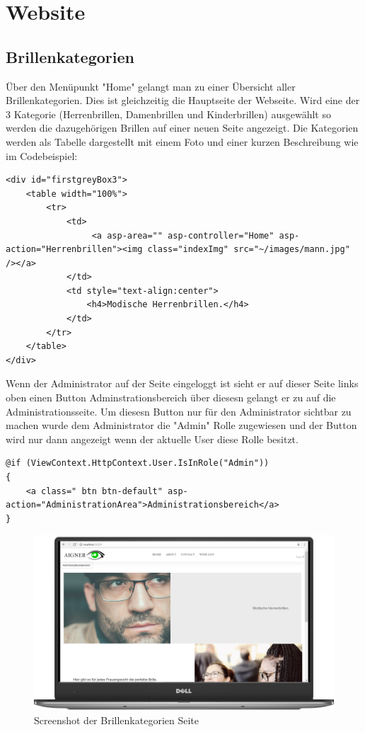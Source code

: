 \section{Website}
\subsection{Brillenkategorien}
Über den Menüpunkt "Home" gelangt man zu einer Übersicht aller Brillenkategorien. Dies ist gleichzeitig die Hauptseite der Webseite. Wird eine der 3 Kategorie (Herrenbrillen, Damenbrillen und Kinderbrillen) ausgewählt so werden die dazugehörigen Brillen auf einer neuen Seite angezeigt.
Die Kategorien werden als Tabelle dargestellt mit einem Foto und einer kurzen Beschreibung wie im Codebeispiel:
\begin{lstlisting}
<div id="firstgreyBox3">
    <table width="100%">
        <tr>
            <td>
                 <a asp-area="" asp-controller="Home" asp-action="Herrenbrillen"><img class="indexImg" src="~/images/mann.jpg" /></a> 
            </td>
            <td style="text-align:center">
                <h4>Modische Herrenbrillen.</h4>
            </td>
        </tr>
    </table>
</div>
\end{lstlisting}
Wenn der Administrator auf der Seite eingeloggt ist sieht er auf dieser Seite links oben einen Button Adminstrationsbereich über diesesn gelangt er zu auf die Administrationsseite. Um diesesn Button nur für den Administrator sichtbar zu machen wurde dem Administrator die "Admin" Rolle zugewiesen und der Button wird nur dann angezeigt wenn der aktuelle User diese Rolle besitzt.

\begin{lstlisting}
@if (ViewContext.HttpContext.User.IsInRole("Admin"))
{
    <a class=" btn btn-default" asp-action="AdministrationArea">Administrationsbereich</a>
}
\end{lstlisting}


\begin{figure}[H]
\begin{center}
	\includegraphics[scale=.2]{images/Index.png}
\end{center}
	\caption{Screenshot der Brillenkategorien Seite}
	\label{fig:sample}
\end{figure}

